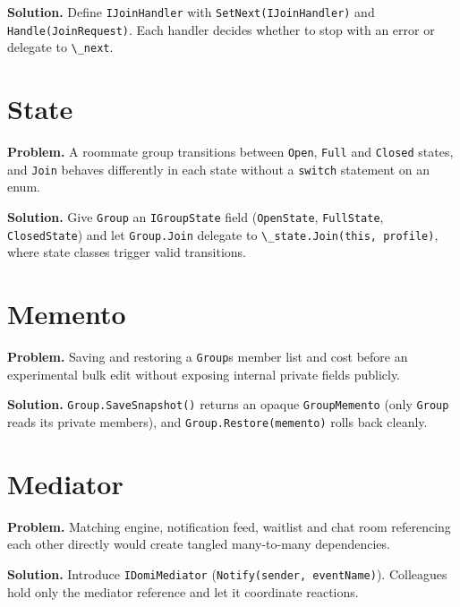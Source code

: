 \documentclass{utmreport}
\providecommand{\passthrough}[1]{#1}
\begin{document}
\textbf{Solution.} Define \passthrough{\lstinline!IJoinHandler!} with \passthrough{\lstinline!SetNext(IJoinHandler)!} and \passthrough{\lstinline!Handle(JoinRequest)!}. Each handler decides whether to stop with an error or delegate to \passthrough{\lstinline!\_next!}.

\section{State}

\textbf{Problem.} A roommate group transitions between \passthrough{\lstinline!Open!}, \passthrough{\lstinline!Full!} and \passthrough{\lstinline!Closed!} states, and \passthrough{\lstinline!Join!} behaves differently in each state without a \passthrough{\lstinline!switch!} statement on an enum.

\textbf{Solution.} Give \passthrough{\lstinline!Group!} an \passthrough{\lstinline!IGroupState!} field (\passthrough{\lstinline!OpenState!}, \passthrough{\lstinline!FullState!}, \passthrough{\lstinline!ClosedState!}) and let \passthrough{\lstinline!Group.Join!} delegate to \passthrough{\lstinline!\_state.Join(this, profile)!}, where state classes trigger valid transitions.

\section{Memento}

\textbf{Problem.} Saving and restoring a \passthrough{\lstinline!Group!}\textquotesingle s member list and cost before an experimental bulk edit without exposing internal private fields publicly.

\textbf{Solution.} \passthrough{\lstinline!Group.SaveSnapshot()!} returns an opaque \passthrough{\lstinline!GroupMemento!} (only \passthrough{\lstinline!Group!} reads its private members), and \passthrough{\lstinline!Group.Restore(memento)!} rolls back cleanly.

\section{Mediator}

\textbf{Problem.} Matching engine, notification feed, waitlist and chat room referencing each other directly would create tangled many-to-many dependencies.

\textbf{Solution.} Introduce \passthrough{\lstinline!IDomiMediator!} (\passthrough{\lstinline!Notify(sender, eventName)!}). Colleagues hold only the mediator reference and let it coordinate reactions.
\end{document}
